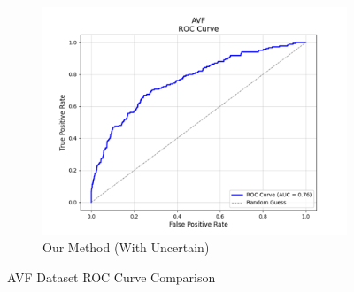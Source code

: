 \documentclass{ieeeaccess}
\begin{document}
\begin{figure}[H]
\begin{subfigure}[b]{0.32\textwidth}
        \label{fig:pta-symptom-method1-roc}
    \end{subfigure}
    \hfill
    \begin{subfigure}[b]{0.32\textwidth}
        \centering
        \includegraphics[width=\linewidth]{AVF_method2_roc.png}
        \caption{Our Method (With Uncertain)}
        \label{fig:pta-symptom-method2-roc}
    \end{subfigure}

    \caption{AVF Dataset ROC Curve Comparison}
    \label{fig:AVF_combined-roc}
\end{figure}
\end{document}
